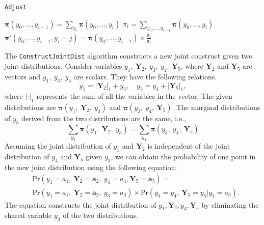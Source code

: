 \documentclass[a4paper,review,12pt,authoryear]{elsarticle}
\let\code=\texttt
\newcommand{\bY}{\mathbf{Y}}
\newcommand{\bpi}{\bm{\pi}}
\begin{document}
\begin{algorithm}[H]
  \label{alg:adjust}
  \caption{\code{Adjust}}
  \Input{$\bpi(y_0,y_1,\dots,y_i), \tilde\pi_i, y_i \in \{0,1,\dots,k_i\}$}

  $\bpi(y_0,\dots,y_{i-1}) = \sum_{y_i}\bpi(y_0,\dots,y_i)$\;
  $\pi_i = \sum_{y_0,\dots,y_{i-1}}\bpi(y_0,\dots,y_i)$ \;
   {
    $\bpi'(y_0,\dots,y_{i-1}, y_i=j) = \bpi(y_0,\dots,y_{i-1}) \times \frac{\tilde\pi_i}{\pi_i}$ \;
  }

  \Output{$\bpi'(y_0,\dots,y_i)$}

 \end{algorithm}


 The \code{ConstructJointDist} algorithm constructs a new joint construct given two joint distributions.
 Consider variables $y_1, ~ \bY_2, ~ y_3, ~ y_4, ~ \bY_5$, where $\bY_2$ and $\bY_5$ are vectors and $y_1, ~ y_3, ~ y_4$ are scalars.
 They have the following relations.
 \[
  y_1 = |\bY_2|_1 + y_3, \quad y_3 = y_4 + |\bY_5|_1,
 \]
 where $|\cdot|_1$ represents the sum of all the variables in the vector.
 The given distributions are $\bpi(y_1, ~ \bY_2, ~ y_3)$ and $\bpi(y_3, ~ y_4, ~ \bY_5)$.
 The marginal distributions of $y_3$ derived from the two distributions are the same, i.e.,
 \[
  \sum_{y_3} \bpi(y_1, ~ \bY_2, ~ y_3) = \sum_{y_3}\bpi(y_3, ~ y_4, ~ \bY_5)
\]
 Assuming the joint distribution of $y_1$ and $\bY_2$ is independent of the joint distribution of $y_4$ and $\bY_5$ given $y_3$, we can obtain the probability of one point in the new joint distribution using the following equation: \[
   \begin{aligned}
  &\text{Pr}(y_1=a_1, ~ \bY_2=\mathbf{a}_2, ~ y_4=a_4, \bY_5 = \mathbf{a}_5) =\\ &\text{Pr} (y_1=a_1, ~ \bY_2=\mathbf{a}_2, ~ y_3=a_3) \times \text{Pr}(y_4=y_4, ~ \bY_5=y_5|y_3=a_3).
   \end{aligned}
 \]
 The equation constructs the joint distribution of $y_1, \bY_2, y_4, \bY_5$ by eliminating the shared variable $y_3$ of the two distributions.
\end{document}
